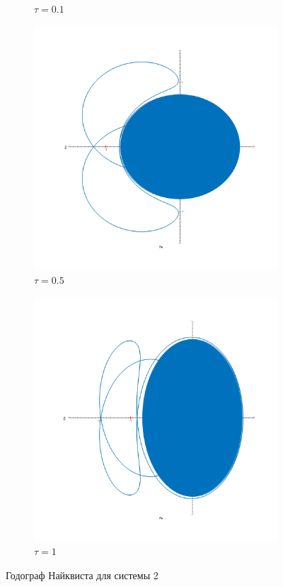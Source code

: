 \begin{figure}[ht!]
\begin{subfigure}[b]{0.5\textwidth}
        \caption{$\tau = 0.1$}
    \end{subfigure}
    \begin{subfigure}[b]{0.5\textwidth}
        \centering
        \includegraphics[width=\textwidth]{media/plots/task7_nyquist_open_3.png}
        \caption{$\tau = 0.5$}
    \end{subfigure}
    \begin{subfigure}[b]{0.5\textwidth}
        \centering
        \includegraphics[width=\textwidth]{media/plots/task7_nyquist_open_4.png}
        \caption{$\tau = 1$}
    \end{subfigure}
    \caption{Годограф Найквиста для системы 2}
    \label{fig:task7_niquist}
\end{figure}
